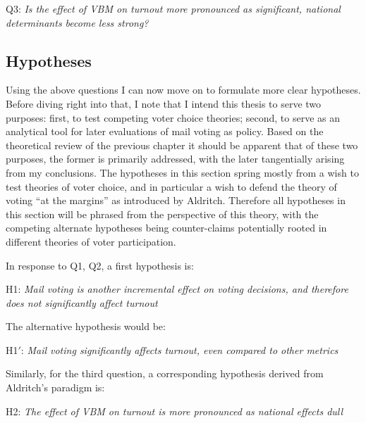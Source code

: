 \documentclass[12pt,twoside]{reedthesis}
\begin{document}
  \begin{center}   
  Q3: \textit{Is  the  effect  of  VBM on turnout more  pronounced as significant, national determinants become less strong?}
  \end{center}
  
  \subsection{Hypotheses}\label{hypotheses-1}
  
  Using the above questions I can now move on to formulate more clear
  hypotheses. Before diving right into that, I note that I intend this
  thesis to serve two purposes: first, to test competing voter choice
  theories; second, to serve as an analytical tool for later evaluations
  of mail voting as policy. Based on the theoretical review of the
  previous chapter it should be apparent that of these two purposes, the
  former is primarily addressed, with the later tangentially arising from
  my conclusions. The hypotheses in this section spring mostly from a wish
  to test theories of voter choice, and in particular a wish to defend the
  theory of voting ``at the margins'' as introduced by Aldritch. Therefore
  all hypotheses in this section will be phrased from the perspective of
  this theory, with the competing alternate hypotheses being
  counter-claims potentially rooted in different theories of voter
  participation.
  
  In response to Q1, Q2, a first hypothesis is:
  
  \begin{center}  
  H1: \textit{Mail voting is another incremental effect on voting decisions, and therefore
  does not significantly affect turnout}
  \end{center}
  
  The alternative hypothesis would be:
  
  \begin{center}  
  H1$'$: \textit{Mail  voting  significantly  affects  turnout,  even  compared  to  other  metrics}
  \end{center}
  
  Similarly, for the third question, a corresponding hypothesis derived
  from Aldritch's paradigm is:
  
  \begin{center}  
  H2: \textit{The  effect  of  VBM  on  turnout  is  more  pronounced  as  national  effects  dull}
  \end{center}
  
\end{document}
